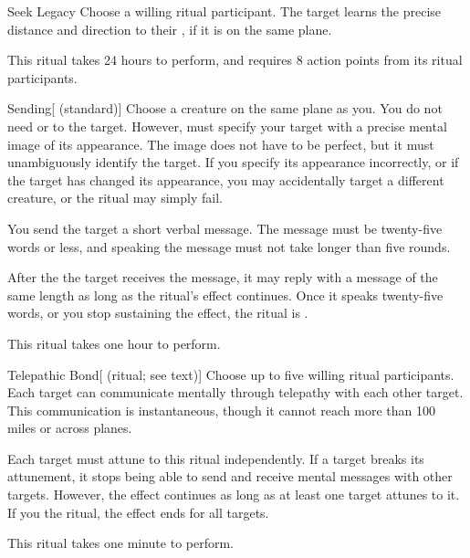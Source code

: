\lowercase{\hypertarget{spell:Seek Legacy}{}}\label{spell:Seek Legacy}
\begin{ability}[\nth{2}]{\hypertarget{spell:Seek Legacy}{Seek Legacy}}
Choose a willing ritual participant.
The target learns the precise distance and direction to their , if it is on the same plane.

This ritual takes 24 hours to perform, and requires 8 action points from its ritual participants.
\end{ability}
\vspace{0.25em}



\lowercase{\hypertarget{spell:Sending}{}}\label{spell:Sending}
\begin{ability}[\nth{3}]{\hypertarget{spell:Sending}{Sending}}[ (standard)]
Choose a creature on the same plane as you.
You do not need  or  to the target.
However,  must specify your target with a precise mental image of its appearance.
The image does not have to be perfect, but it must unambiguously identify the target.
If you specify its appearance incorrectly, or if the target has changed its appearance, you may accidentally target a different creature, or the ritual may simply fail.

You send the target a short verbal message.
The message must be twenty-five words or less, and speaking the message must not take longer than five rounds.

After the the target receives the message, it may reply with a message of the same length as long as the ritual's effect continues.
Once it speaks twenty-five words, or you stop sustaining the effect, the ritual is .

This ritual takes one hour to perform.
\end{ability}
\vspace{0.25em}



\lowercase{\hypertarget{spell:Telepathic Bond}{}}\label{spell:Telepathic Bond}
\begin{ability}[\nth{3}]{\hypertarget{spell:Telepathic Bond}{Telepathic Bond}}[ (ritual; see text)]
Choose up to five willing ritual participants.
Each target can communicate mentally through telepathy with each other target.
This communication is instantaneous, though it cannot reach more than 100 miles or across planes.

Each target must attune to this ritual independently.
If a target breaks its attunement, it stops being able to send and receive mental messages with other targets.
However, the effect continues as long as at least one target attunes to it.
If you  the ritual, the effect ends for all targets.

This ritual takes one minute to perform.
\end{ability}
\vspace{0.25em}




